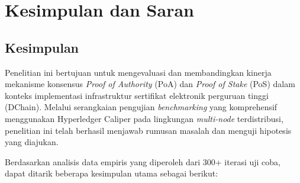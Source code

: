 \chapter{Kesimpulan dan Saran}

\section{Kesimpulan}

Penelitian ini bertujuan untuk mengevaluasi dan membandingkan kinerja mekanisme konsensus \textit{Proof of Authority} (PoA) dan \textit{Proof of Stake} (PoS) dalam konteks implementasi infrastruktur sertifikat elektronik perguruan tinggi (DChain). Melalui serangkaian pengujian \textit{benchmarking} yang komprehensif menggunakan Hyperledger Caliper pada lingkungan \textit{multi-node} terdistribusi, penelitian ini telah berhasil menjawab rumusan masalah dan menguji hipotesis yang diajukan.

Berdasarkan analisis data empiris yang diperoleh dari 300+ iterasi uji coba, dapat ditarik beberapa kesimpulan utama sebagai berikut:

